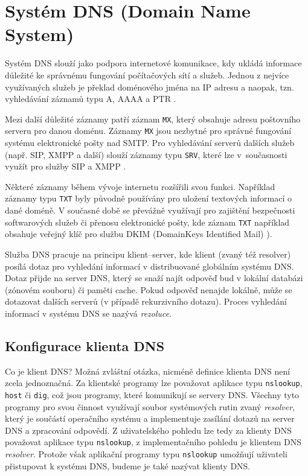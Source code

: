 \section{Systém DNS (Domain Name System)}\label{dns}
Systém DNS slouží jako podpora internetové komunikace, kdy ukládá informace důležité ke správnému fungování počítačových sítí a služeb. Jednou z nejvíce využívaných služeb je překlad doménového jména na IP adresu a naopak, tzn. vyhledávání záznamů typu A, AAAA a PTR \cite{rfc1035,rfc3596}.

Mezi další důležité záznamy patří záznam {\tt MX}, který obsahuje adresu poštovního serveru pro danou doménu. Záznamy {\tt MX} jsou nezbytné pro správné fungování systému elektronické pošty nad SMTP. Pro vyhledávání serverů dalších služeb (např. SIP, XMPP a další) slouží záznamy typu {\tt SRV}, které lze v~současnosti využít pro služby SIP a XMPP \cite{rfc2782}.

Některé záznamy během vývoje internetu rozšířili svou funkci. Například záznamy typu {\tt TXT} byly původně používány pro uložení textových informací o dané doméně. V současné době se převážně využívají pro zajištění bezpečnosti softwarových služeb či přenosu elektronické pošty, kde záznam {\tt TXT} například obsahuje veřejný klíč pro službu DKIM (DomainKeys Identified Mail) \cite{rfc6376}).

Služba DNS pracuje na principu klient--server, kde klient (zvaný též resolver) posílá dotaz pro vyhledání informací v distribuované globálním systému DNS. Dotaz přijde na server DNS, který se snaží najít odpověď bud v lokální databázi (zónovém souboru) či paměti cache. Pokud odpověď nenajde lokálně, může se dotazovat dalších serverů (v případě rekurzivního dotazu). Proces vyhledání informací v systému DNS se nazývá {\em rezoluce}. 

\subsection{Konfigurace klienta DNS}
Co je klient DNS? Možná zvláštní otázka, nicméně definice klienta DNS není zcela jednoznačná. Za klientské programy lze považovat aplikace typu {\tt nslookup}, {\tt host} či {\tt dig}, což jsou programy, které komunikují se servery DNS. Všechny tyto programy pro svou činnost využívají soubor systémových rutin zvaný {\em resolver}, který je součástí operačního systému a implementuje zasílání dotazů na server DNS a zpracování odpovědí. Z uživatelského pohledu lze tedy za klienty DNS považovat aplikace typu {\tt nslookup}, z implementačního pohledu je klientem DNS {\em resolver}. Protože však aplikační programy typu {\tt nslookup} umožňují uživateli přistupovat k systému DNS, budeme je také nazývat klienty DNS.

